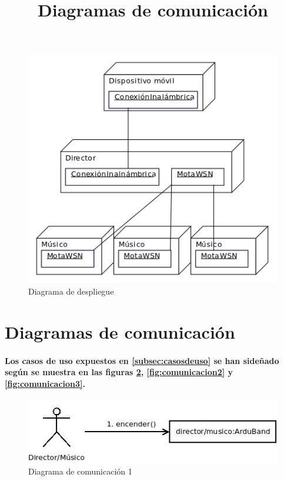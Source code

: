 \begin{figure}[htb]
\centering
\includegraphics[width=1\textwidth]{./imagenes/diagramadespliegue}
\caption{Diagrama de despliegue} \label{fig:diagramadespliegue}
\end{figure}

\section{Diagramas de comunicación}
\title{Diagramas de comunicación}

\paragraph{
Los casos de uso expuestos en \ref{subsec:casosdeuso} se han sideñado según
se muestra en las figuras \ref{fig:comunicacion1},  \ref{fig:comunicacion2} y
\ref{fig:comunicacion3}.
}

\begin{figure}[htb]
\centering
\includegraphics[width=1\textwidth]{./imagenes/comunicacion1}
\caption{Diagrama de comunicación 1} \label{fig:comunicacion1}
\end{figure}

